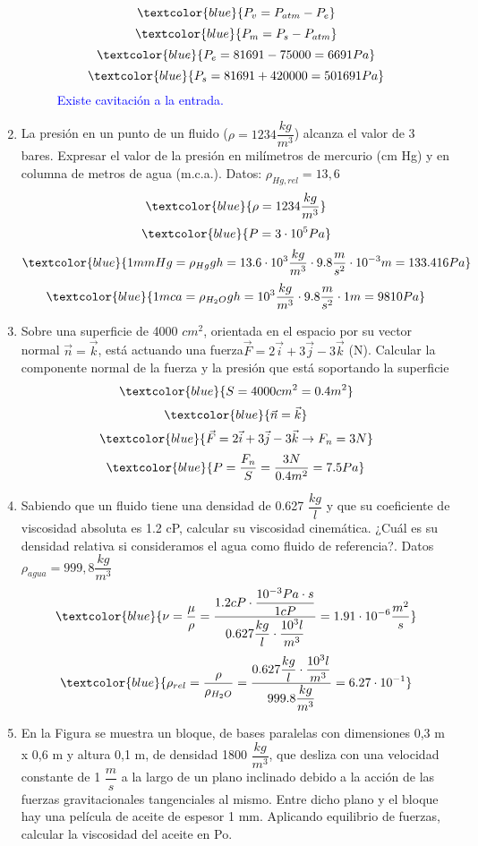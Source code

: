 \begin{enumerate}
\begin{figure}[H]
\begin{minipage}{0.7\textwidth}
\begin{figure}[H]
			\label{fig:my_label}
		\end{figure}
		\end{minipage}%
	\begin{minipage}{0.3\textwidth}
	\[\textcolor{blue}{P_v=P_{atm}-P_e}\]
	\[\textcolor{blue}{P_m=P_s-P_{atm}}\]
\[ \textcolor{blue}{P_e=81691-75000=6691 Pa}\]
\[\textcolor{blue}{P_s=81691+420000=501691 Pa}\]
\textcolor{blue}{Existe cavitación a la entrada.}
	
	\end{minipage}
\end{figure}

	\newpage
	\item La presión en un punto de un fluido ($\rho = 1234 \dfrac{kg}{m^3}$) alcanza el valor de 3 bares. Expresar
	el valor de la presión en milímetros de mercurio (cm Hg) y en columna de metros de agua
	(m.c.a.). Datos: $\rho_{Hg,rel} = 13,6$
	\[\textcolor{blue}{\rho = 1234 \dfrac{kg}{m^3}}\]
	\[\textcolor{blue}{P=3\cdot10^5 Pa}\]
	\[\textcolor{blue}{1mmHg=\rho_{Hg}g h=13.6\cdot10^3\dfrac{kg}{m^3} \cdot9.8 \dfrac{m}{s^2}\cdot10^{-3}m=133.416Pa} \]
	\[\textcolor{blue}{1mca=\rho_{H_2O}g h=10^3\dfrac{kg}{m^3}\cdot9.8 \dfrac{m}{s^2}\cdot1m=9810Pa}\]
	\item Sobre una superficie de 4000 $cm^2$, orientada en el espacio por su vector normal $\vec{n}=\vec{k}$, está
	actuando una fuerza$\vec{F}=2\vec{i}+3\vec{j}-3\vec{k}$ (N). Calcular la componente normal de la fuerza y
	la presión que está soportando la superficie
		\[\textcolor{blue}{S=4000 cm^2=0.4 m^2}\]
	\[\textcolor{blue}{\vec{n}=\vec{k}}\]
	\[\textcolor{blue}{\vec{F}=2\vec{i}+3\vec{j}-3\vec{k} \rightarrow F_n=3N}\]
	\[\textcolor{blue}{P=\dfrac{F_n}{S}=\dfrac{3 N}{0.4 m^2}=7.5Pa}\]
	
	\item Sabiendo que un fluido tiene una densidad de 0.627 $\dfrac{kg}{l}$ y que su coeficiente de viscosidad
	absoluta es 1.2 cP, calcular su viscosidad cinemática. ¿Cuál es su densidad relativa si
	consideramos el agua como fluido de referencia?. Datos $\rho_{agua} = 999,8\dfrac{kg}{m^3}$
\[\textcolor{blue}{\nu = \dfrac{\mu}{\rho}=\dfrac{1.2 cP \cdot \dfrac{10^{-3} Pa \cdot s}{1 cP}}{0.627 \dfrac{kg}{l}\cdot\dfrac{10^3 l}{m^3}}=1.91\cdot10^{-6}\dfrac{m^2}{s}}\]
\[\textcolor{blue}{\rho_{rel}=\dfrac{\rho}{\rho_{H_2O}}=\dfrac{0.627 \dfrac{kg}{l}\cdot\dfrac{10^3 l}{m^3}}{999.8 \dfrac{kg}{m^3}}=6.27\cdot10^{-1}}\]

	\item En la Figura se muestra un bloque, de bases paralelas con dimensiones 0,3 m x 0,6
	m y altura 0,1 m, de densidad 1800 $\dfrac{kg}{m^3}$, que desliza con una velocidad constante de
	1 $\dfrac{m}{s}$ a la largo de un plano inclinado debido a la acción de las fuerzas gravitacionales
	tangenciales al mismo. Entre dicho plano y el bloque hay una película de aceite de espesor
	1 mm. Aplicando equilibrio de fuerzas, calcular la viscosidad del aceite en Po.
	\begin{figure}[H]
		

\end{figure}
\end{enumerate}

